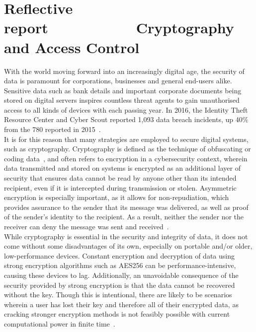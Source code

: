 \documentclass[12pt]{report}
\begin{document}
    \chapter*{Reflective report~~~~~~~~~~~\footnotesize{Cryptography and Access Control}}\label{ch:conclusion}

    \small
    With the world moving forward into an increasingly digital age, the security of data is paramount for
    corporations, businesses and general end-users alike.
    Sensitive data such as bank details and important corporate documents being stored on digital servers inspires
    countless threat agents to gain unauthorised access to all kinds of devices with each passing year.
    In 2016, the Identity Theft Resource Center and Cyber Scout reported 1,093 data breach incidents, up 40\%
    from the 780 reported in 2015~\autocite{DataBreaches}.\\

    \noindent It is for this reason that many strategies are employed to secure digital systems, such as cryptography.
    Cryptography is defined as the technique of obfuscating or coding data~\autocite{KSCryptography}, and often refers
    to encryption in a cybersecurity context, wherein data transmitted and stored on systems
    is encrypted as an additional layer of security that ensures data cannot be read by anyone other than its
    intended recipient, even if it is intercepted during transmission or stolen.
    Asymmetric encryption is especially important, as it allows for non-repudiation, which provides
    assurance to the sender that its message was delivered, as well as proof of the sender's identity to the recipient.
    As a result, neither the sender nor the receiver can deny the message was sent and received~\autocite{NR}.\\

    \noindent While cryptography is essential in the security and integrity of data, it does not come
    without some disadvantages of its own, especially on portable and/or older, low-performance devices.
    Constant encryption and decryption of data using strong encryption algorithms such as AES256 can be
    performance-intensive, causing these devices to lag.
    Additionally, an unavoidable consequence of the security provided by strong encryption is that the data
    cannot be recovered without the key.
    Though this is intentional, there are likely to be scenarios wherein a user has lost their key and therefore
    all of their encrypted data, as cracking stronger encryption methods is not feasibly possible with
    current computational power in finite time~\autocite{AESFinite}.\\
\end{document}
